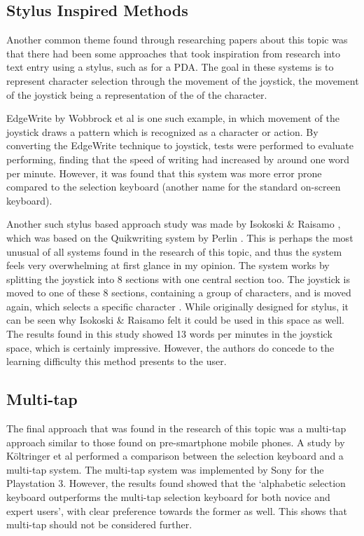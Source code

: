 \documentclass[requirements.tex]{subfiles}
\begin{document}
\subsection{Stylus Inspired Methods} %
\label{sub:stylus_inspired_methods}
Another common theme found through researching papers about this topic was that
there had been some approaches that took inspiration from research into text
entry using a stylus, such as for a PDA. The goal in these systems is to
represent character selection through the movement of the joystick, the movement
of the joystick being a representation of the of the character.

EdgeWrite \cite{Wobbrock:2004:JTE:985921.986126}
\cite{Wobbrock:2003:EST:964696.964703} by Wobbrock et al is one such example, in
which movement of the joystick draws a pattern which is recognized as a
character or action. By converting the EdgeWrite technique to joystick, tests
were performed to evaluate performing, finding that the speed of writing had
increased by around one word per minute. However, it was found that this system
was more error prone compared to the selection keyboard (another name for the
standard on-screen keyboard).

Another such stylus based approach study was made by Isokoski \& Raisamo
\cite{Isokoski:2004:QMT:1028014.1028031}, which was based on the Quikwriting
system by Perlin \cite{Perlin:1998:QCS:288392.288613}. This is perhaps the most
unusual of all systems found in the research of this topic, and thus the system
feels very overwhelming at first glance in my opinion. The system works by 
splitting the joystick into 8 sections with one central section too. The
joystick is moved to one of these 8 sections, containing a group of characters,
and is moved again, which selects a specific character 
\cite[Figure~2]{Isokoski:2004:QMT:1028014.1028031}. While originally designed
for stylus, it can be seen why Isokoski \& Raisamo felt it could be used in this
space as well. The results found in this study showed 13 words per minutes
in the joystick space, which is certainly impressive. However, the authors do
concede to the learning difficulty this method presents to the user.

\subsection{Multi-tap} %
\label{sub:multi-tap}
The final approach that was found in the research of this topic was a multi-tap
approach similar to those found on pre-smartphone mobile phones. A study by
K\"{o}ltringer et al \cite{Koltringer:2007:GCT:1240866.1241033} performed a
comparison between the selection keyboard and a multi-tap system. The multi-tap
system was implemented by Sony for the Playstation 3. However, the results
found showed that  the `alphabetic selection keyboard outperforms the multi-tap
selection keyboard for both novice and expert users', with clear preference
towards the former as well. This shows that multi-tap should not be considered
further.
\end{document}
